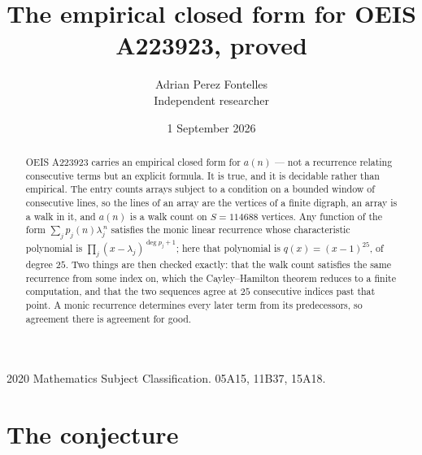 \documentclass[11pt,a4paper]{article}
\title{The empirical closed form for OEIS A223923, proved}
\author{Adrian Perez Fontelles\\ \small Independent researcher}
\date{1 September 2026}
\theoremstyle{plain}
\theoremstyle{definition}
\begin{document}
\maketitle

\begin{abstract}
OEIS A223923 carries an empirical closed form for $a(n)$ --- not a recurrence relating
consecutive terms but an explicit formula. It is true, and it is decidable rather than
empirical. The entry counts arrays subject to a condition on a bounded window of consecutive lines, so the lines of an array are the
vertices of a finite digraph, an array is a walk in it, and $a(n)$ is a walk count on
$S=114688$ vertices. Any function of the form $\sum_j p_j(n)\lambda_j^{\,n}$ satisfies the
monic linear recurrence whose characteristic polynomial is
$\prod_j(x-\lambda_j)^{\deg p_j+1}$; here that polynomial is $q(x)=(x-1)^{25}$, of degree
$25$. Two things are then checked exactly: that the walk count satisfies the same
recurrence from some index on, which the Cayley--Hamilton theorem reduces to a finite
computation, and that the two sequences agree at $25$ consecutive indices past that
point. A monic recurrence determines every later term from its predecessors, so agreement
there is agreement for good.
\end{abstract}

\noindent\small 2020 Mathematics Subject Classification. 05A15, 11B37, 15A18.\normalsize

\section{The conjecture}
\end{document}
